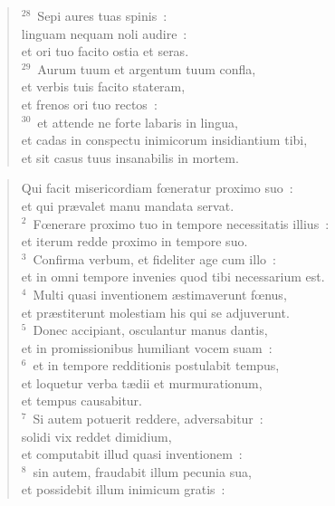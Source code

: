 \begin{flushleft}
\begin{verse}
${}^{28}$~Sepi aures tuas spinis~:\\ linguam nequam noli audire~:\\ et ori tuo facito ostia et seras.\\
${}^{29}$~Aurum tuum et argentum tuum confla,\\ et verbis tuis facito stateram,\\ et frenos ori tuo rectos~:\\
${}^{30}$~et attende ne forte labaris in lingua,\\ et cadas in conspectu inimicorum insidiantium tibi,\\ et sit casus tuus insanabilis in mortem.\end{verse}\end{flushleft}


\begin{flushleft}\begin{verse}\vspace{-19pt}\hspace{6pt}Qui facit misericordiam fœneratur proximo suo~:\\\hspace{6pt} et qui pr\ae valet manu mandata servat.\\
${}^{2}$~Fœnerare proximo tuo in tempore necessitatis illius~:\\ et iterum redde proximo in tempore suo.\\
${}^{3}$~Confirma verbum, et fideliter age cum illo~:\\ et in omni tempore invenies quod tibi necessarium est.\\
${}^{4}$~Multi quasi inventionem \ae stimaverunt fœnus,\\ et pr\ae stiterunt molestiam his qui se adjuverunt.\\
${}^{5}$~Donec accipiant, osculantur manus dantis,\\ et in promissionibus humiliant vocem suam~:\\
${}^{6}$~et in tempore redditionis postulabit tempus,\\ et loquetur verba t\ae dii et murmurationum,\\ et tempus causabitur.\\
${}^{7}$~Si autem potuerit reddere, adversabitur~:\\ solidi vix reddet dimidium,\\ et computabit illud quasi inventionem~:\\
${}^{8}$~sin autem, fraudabit illum pecunia sua,\\ et possidebit illum inimicum gratis~:\\

\end{verse}
\end{flushleft}
